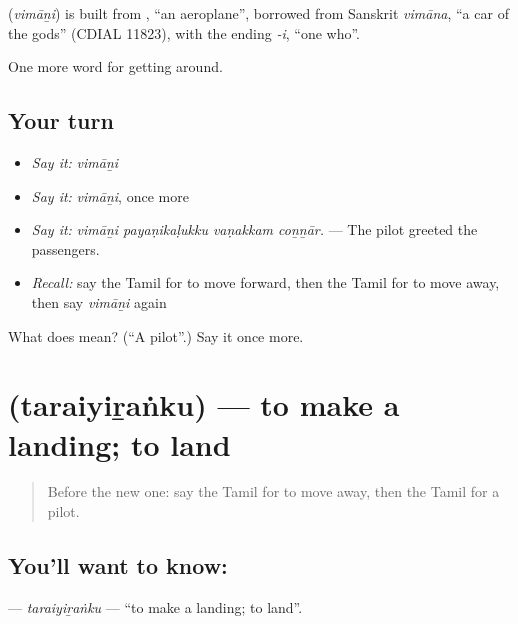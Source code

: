 \begin{cousinweb}
\textbf{} (\emph{vimāṉi}) is built from , \textquotedblleft{}an aeroplane\textquotedblright{}, borrowed from Sanskrit \emph{vimāna}, \textquotedblleft{}a car of the gods\textquotedblright{} (CDIAL 11823), with the ending \emph{-i}, \textquotedblleft{}one who\textquotedblright{}.
\end{cousinweb}

\begin{grammarlens}[title={What you've built}]
One more word for getting around.
\end{grammarlens}

\subsection*{Your turn}
\begin{itemize}
\raggedright
  \item \emph{Say it:} \emph{vimāṉi}
  \item \emph{Say it:} \emph{vimāṉi}, once more
  \item \emph{Say it:} \emph{vimāṉi payaṇikaḷukku vaṇakkam coṉṉār.} — The pilot greeted the passengers.
  \item \emph{Recall:} say the Tamil for to move forward, then the Tamil for to move away, then say \emph{vimāṉi} again
\end{itemize}

\begin{tcolorbox}[breakable,colback=teal!4,colframe=teal!35!black,title={Before you move on}]
What does  mean? (\textquotedblleft{}A pilot\textquotedblright{}.) Say it once more.
\end{tcolorbox}
\section[\texorpdfstring{\ta{தரையிறங்கு} (taraiyiṟaṅku)}{தரையிறங்கு (taraiyiṟaṅku)}]{ (taraiyiṟaṅku) — to make a landing; to land}

\label{lesson:TA-C413-taraiyiranku}



\begin{quote}
Before the new one: say the Tamil for to move away, then the Tamil for a pilot.
\end{quote}

\subsection*{You'll want to know: }
\textbf{} — \emph{taraiyiṟaṅku} — \textquotedblleft{}to make a landing; to land\textquotedblright{}.

